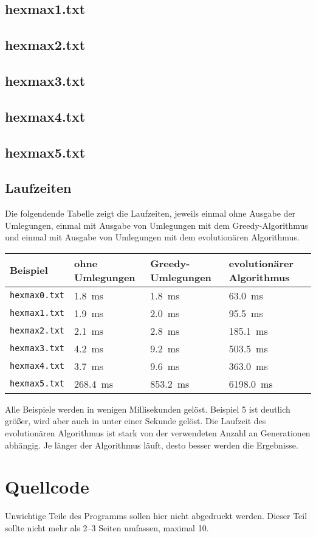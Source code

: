 \documentclass[a4paper,10pt,ngerman]{scrartcl}
\begin{document}
\subsection*{hexmax1.txt}

\subsection*{hexmax2.txt}

\subsection*{hexmax3.txt}

\subsection*{hexmax4.txt}

\subsection*{hexmax5.txt}


\subsection{Laufzeiten}
Die folgendende Tabelle zeigt die Laufzeiten, jeweils einmal ohne Ausgabe der Umlegungen, einmal mit Ausgabe von Umlegungen mit dem Greedy-Algorithmus und einmal mit Ausgabe von Umlegungen mit dem evolutionären Algorithmus.
\begin{table}[H]
    \centering
    \begin{tabular}{llll}
        \toprule
        Beispiel & ohne  Umlegungen &  Greedy-Umlegungen & evolutionärer Algorithmus\\ \midrule
        \texttt{hexmax0.txt} & \SI{1.8}{\milli\second} & \SI{1.8}{\milli\second} &  \SI{  63.0}{\milli\second}\\
        \texttt{hexmax1.txt} & \SI{1.9}{\milli\second} & \SI{2.0}{\milli\second}&   \SI{  95.5}{\milli\second}\\
        \texttt{hexmax2.txt} & \SI{2.1}{\milli\second} & \SI{2.8}{\milli\second}&   \SI{ 185.1}{\milli\second}\\
        \texttt{hexmax3.txt} & \SI{4.2}{\milli\second} & \SI{9.2}{\milli\second}&   \SI{ 503.5}{\milli\second} \\
        \texttt{hexmax4.txt} & \SI{3.7}{\milli\second} & \SI{9.6}{\milli\second}&   \SI{ 363.0}{\milli\second} \\
        \texttt{hexmax5.txt} & \SI{268.4}{\milli\second} & \SI{853.2}{\milli\second}& \SI{6198.0}{\milli\second}\\
        \bottomrule
    \end{tabular}
\end{table}
Alle Beispiele werden in wenigen Millisekunden gelöst. Beispiel 5 ist deutlich größer, wird aber auch in unter einer Sekunde gelöst. 
Die Laufzeit des evolutionären Algorithmus ist stark von der verwendeten Anzahl an Generationen abhängig. Je länger der Algorithmus läuft, desto besser werden die Ergebnisse.
\section{Quellcode}
Unwichtige Teile des Programms sollen hier nicht abgedruckt werden. Dieser Teil sollte nicht mehr als 2–3 Seiten umfassen, maximal 10.
\end{document}
